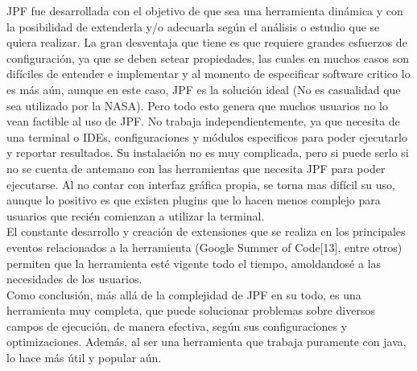 \documentclass[runningheads]{llncs}
\begin{document}
JPF fue desarrollada con el objetivo de que sea una herramienta din\'amica y con la posibilidad de extenderla y/o adecuarla seg\'un el an\'alisis o estudio que se quiera realizar. La gran desventaja que tiene es que requiere grandes esfuerzos de configuraci\'on, ya que se deben setear propiedades, las cuales en muchos casos son dif\'iciles de entender e implementar y al momento de especificar software critico lo es m\'as a\'un, aunque en este caso, JPF es la soluci\'on ideal (No es casualidad que sea utilizado por la NASA). Pero todo esto genera que muchos usuarios no lo vean factible al uso de JPF.
No trabaja independientemente, ya que necesita de una terminal o IDEs, configuraciones y m\'odulos especificos para poder ejecutarlo y reportar resultados. Su instalaci\'on no es muy complicada, pero si puede serlo si no se cuenta de antemano con las herramientas que necesita JPF para poder ejecutarse. Al no contar con interfaz gr\'afica propia, se torna mas dif\'icil su uso, aunque lo positivo es que existen plugins que lo hacen menos complejo para usuarios que reci\'en comienzan a utilizar la terminal.\\
El constante desarrollo y creaci\'on de extensiones que se realiza en los principales eventos relacionados a la herramienta (Google Summer of Code[13], entre otros) permiten que la herramienta est\'e vigente todo el tiempo, amoldandos\'e a las necesidades de los usuarios.\\
Como conclusi\'on, m\'as all\'a de la complejidad de JPF en su todo, es una herramienta muy completa, que puede solucionar problemas sobre diversos campos de ejecuci\'on, de manera efectiva, seg\'un sus configuraciones y optimizaciones. Adem\'as, al ser una herramienta que trabaja puramente con java, lo hace m\'as \'util y popular a\'un.


%
%
%
% 
% 
%
\end{document}
